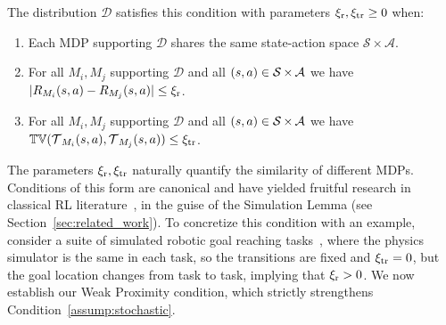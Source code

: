\documentclass[11pt,twoside]{article}
\begin{document}
\begin{condition}
\label{assump:stochastic}
The distribution $\mathcal{D}$ satisfies this condition with parameters $\operatorname{\xi_r}, \operatorname{\xi_{tr}} \geq 0$ when:
\begin{enumerate}[label=(\alph*), leftmargin=*]
\item Each MDP supporting $\mathcal{D}$ shares the same state-action space $\mathcal{S} \times \mathcal{A}$.
\item For all $M_i, M_j$ supporting $\mathcal{D}$ and all $(s, a) \in \operatorname{\mathcal{S}} \times \operatorname{\mathcal{A}}$ we have $\vert R_{M_i}(s, a) - R_{M_j}(s, a) \vert \leq \operatorname{\xi_r}$.
\item For all $M_i, M_j$ supporting $\mathcal{D}$ and all $(s, a) \in \operatorname{\mathcal{S}} \times \operatorname{\mathcal{A}}$ we have $\operatorname{\mathbb{TV}}(\operatorname{\mathcal{T}}_{M_i}(s, a), \operatorname{\mathcal{T}}_{M_j}(s, a)) \leq \operatorname{\xi_{tr}}$.
\end{enumerate}
\end{condition}
The parameters $\operatorname{\xi_r}, \operatorname{\xi_{tr}}$ naturally quantify the similarity of different MDPs. Conditions of this form are canonical and have yielded fruitful research in classical RL literature~\citep{kearns99, kearns02, brafman03, kakade03, abbeel05}, in the guise of the Simulation Lemma (see Section~\ref{sec:related_work}). To concretize this condition with an example, consider a suite of simulated robotic goal reaching tasks~\citep{yu19}, where the physics simulator is the same in each task, so the transitions are fixed and $\operatorname{\xi_{tr}} = 0$, but the goal location changes from task to task, implying that $\operatorname{\xi_r} > 0$. We now establish our Weak Proximity condition, which strictly strengthens Condition~\ref{assump:stochastic}.
\end{document}

